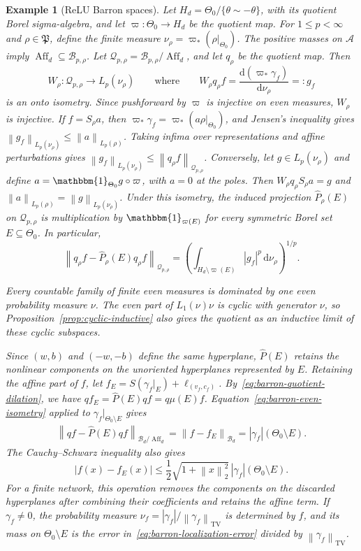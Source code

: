 \documentclass[11pt,leqno]{amsart}
\theoremstyle{compact}
\numberwithin{equation}{section}
\theoremstyle{compactremark}
\newtheorem{example}[theorem]{Example}
\theoremstyle{compact}
\newcommand{\1}{\mathbbm{1}}
\newcommand{\rmd}{\mathrm{d}}
\newcommand{\norm}[1]{\left\|#1\right\|}
\newcommand{\abs}[1]{\left|#1\right|}
\begin{document}
\begin{example}[ReLU Barron spaces]
\begingroup
Let $H_d=\Theta_0/\{\theta\sim-\theta\}$, with its quotient Borel sigma-algebra, and let $\varpi\colon\Theta_0\to H_d$ be the quotient map. For $1\leq p<\infty$ and $\rho\in\mathfrak P$, define the finite measure $\nu_\rho=\varpi_*(\rho|_{\Theta_0})$. The positive masses on $\mathcal A$ imply $\operatorname{Aff}_d\subseteq\mathcal B_{p,\rho}$. Let $\mathcal Q_{p,\rho}=\mathcal B_{p,\rho}/\operatorname{Aff}_d$, and let $q_\rho$ be the quotient map. Then
\[
W_\rho\colon\mathcal Q_{p,\rho}\longrightarrow L_p(\nu_\rho) \qquad\text{where}\qquad
W_\rho q_\rho f=\frac{\rmd(\varpi_*\gamma_f)}{\rmd\nu_\rho}=:g_f
\]
is an onto isometry. Since pushforward by $\varpi$ is injective on even measures, $W_\rho$ is injective. If $f=S_\rho a$, then $\varpi_*\gamma_f=\varpi_*(a\rho|_{\Theta_0})$, and Jensen's inequality gives $\norm{g_f}_{L_p(\nu_\rho)}\leq\norm{a}_{L_p(\rho)}$. Taking infima over representations and affine perturbations gives $\norm{g_f}_{L_p(\nu_\rho)}\leq\norm{q_\rho f}_{\mathcal Q_{p,\rho}}$. Conversely, let $g\in L_p(\nu_\rho)$ and define $a=\1_{\Theta_0}g\circ\varpi$, with $a=0$ at the poles. Then $W_\rho q_\rho S_\rho a=g$ and $\norm{a}_{L_p(\rho)}=\norm{g}_{L_p(\nu_\rho)}$. Under this isometry, the induced projection $\widehat P_\rho(E)$ on $\mathcal Q_{p,\rho}$ is multiplication by $\1_{\varpi(E)}$ for every symmetric Borel set $E\subseteq\Theta_0$. In particular,
\[
\norm{q_\rho f-\widehat P_\rho(E)q_\rho f}_{\mathcal Q_{p,\rho}}
=\left(\int_{H_d\setminus\varpi(E)}\abs{g_f}^p\,\rmd\nu_\rho\right)^{1/p}.
\]
\par\endgroup

Every countable family of finite even measures is dominated by one even probability measure $\nu$. The even part of $L_1(\nu)\nu$ is cyclic with generator $\nu$, so Proposition~\ref{prop:cyclic-inductive} also gives the quotient as an inductive limit of these cyclic subspaces.

Since $(w,b)$ and $(-w,-b)$ define the same hyperplane, $\widehat P(E)$ retains the nonlinear components on the unoriented hyperplanes represented by $E$. Retaining the affine part of $f$, let $f_E=S(\gamma_f|_E)+\ell_{(v_f,c_f)}$. By~\eqref{eq:barron-quotient-dilation}, we have $qf_E=\widehat P(E)qf=q\mu(E)f$. Equation~\eqref{eq:barron-even-isometry} applied to $\gamma_f|_{\Theta_0\setminus E}$ gives
\begin{equation}\label{eq:barron-localization-error}
\begin{aligned}
    \norm{qf-\widehat P(E)qf}_{\mathcal B_d/\operatorname{Aff}_d}=\norm{f-f_E}_{\mathcal B_d}=\abs{\gamma_f}(\Theta_0\setminus E).
\end{aligned}
\end{equation}
The Cauchy--Schwarz inequality also gives
\[
\abs{f(x)-f_E(x)}\leq\frac{1}{2}\sqrt{1+\norm{x}_2^2}\,\abs{\gamma_f}(\Theta_0\setminus E).
\]
For a finite network, this operation removes the components on the discarded hyperplanes after combining their coefficients and retains the affine term. If $\gamma_f\neq0$, the probability measure $\nu_f=\abs{\gamma_f}/\norm{\gamma_f}_{\mathrm{TV}}$ is determined by $f$, and its mass on $\Theta_0\setminus E$ is the error in~\eqref{eq:barron-localization-error} divided by $\norm{\gamma_f}_{\mathrm{TV}}$.


\end{example}
\end{document}
